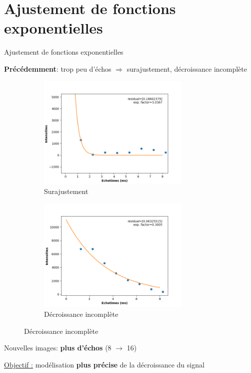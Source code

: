 \documentclass[10pt]{beamer}
\begin{document}
\section{Ajustement de fonctions exponentielles}
\begin{frame}{Ajustement de fonctions exponentielles}
  
  \textbf{Précédemment}: trop peu d'échos $\Rightarrow$ surajustement, décroissance incomplète

  \begin{figure}[ht]
    \centering
    \begin{subfigure}[t]{0.5\textwidth}
      \centering
      \includegraphics[width=0.8\textwidth]{fig/wrongfit_overfitting}
      \caption{Surajustement}
      \label{subfig:wrongfit_overfitting}
    \end{subfigure}%
    \begin{subfigure}[t]{0.5\textwidth}
      \centering
      \includegraphics[width=0.8\textwidth]{fig/wrongfit_missing}
      \caption{Décroissance incomplète}
      \label{subfig:wrongfit_missing}
    \end{subfigure}%

  \end{figure}


  Nouvelles images: \textbf{plus d'échos} (8 $\rightarrow$ 16)

  \underline{Objectif :} modélisation \textbf{plus précise} de la décroissance du signal  
\end{frame}
\end{document}
